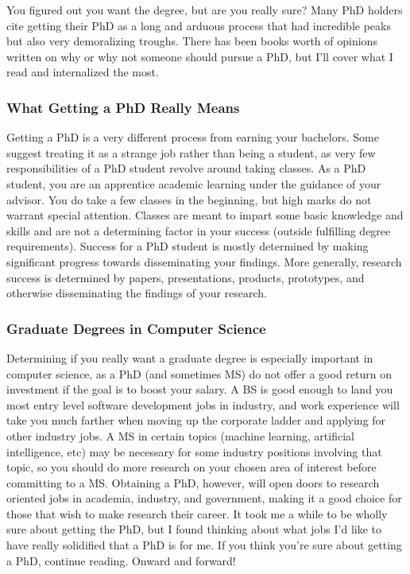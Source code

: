 \documentclass[12pt]{article}
\begin{document}
You figured out you want the degree, but are you really sure? Many PhD holders cite getting their PhD as a long and arduous process that had incredible peaks but also very demoralizing troughs. \cite{AzumaPhD} There has been books worth of opinions written on why or why not someone should pursue a PhD, but I'll cover what I read and internalized the most.

\subsubsection{What Getting a PhD Really Means}

Getting a PhD is a very different process from earning your bachelors. Some suggest treating it as a strange job rather than being a student, as very few responsibilities of a PhD student revolve around taking classes. \cite{AzumaPhD} As a PhD student, you are an apprentice academic learning under the guidance of your advisor. You do take a few classes in the beginning, but high marks do not warrant special attention. Classes are meant to impart some basic knowledge and skills and are not a determining factor in your success (outside fulfilling degree requirements). Success for a PhD student is mostly determined by making significant progress towards disseminating your findings. More generally, research success is determined by papers, presentations, products, prototypes, and otherwise disseminating the findings of your research.

\subsubsection{Graduate Degrees in Computer Science}

Determining if you really want a graduate degree is especially important in computer science, as a PhD (and sometimes MS) do not offer a good return on investment if the goal is to boost your salary. A BS is good enough to land you most entry level software development jobs in industry, and work experience will take you much farther when moving up the corporate ladder and applying for other industry jobs. A MS in certain topics (machine learning, artificial intelligence, etc) may be necessary for some industry positions involving that topic, so you should do more research on your chosen area of interest before committing to a MS. Obtaining a PhD, however, will open doors to research oriented jobs in academia, industry, and government, making it a good choice for those that wish to make research their career. \cite{robertsonwebsite} It took me a while to be wholly sure about getting the PhD, but I found thinking about what jobs I'd like to have really solidified that a PhD is for me. If you think you're sure about getting a PhD, continue reading. Onward and forward!
\end{document}
